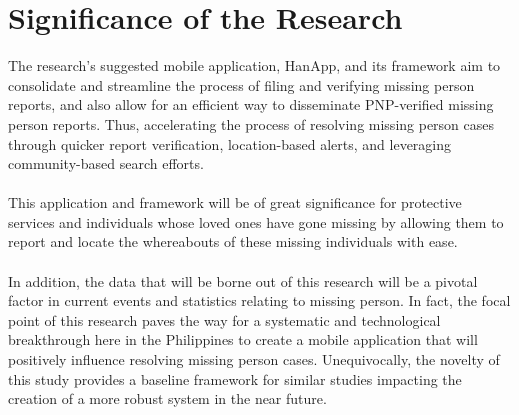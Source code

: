 \section{Significance of the Research}
\label{sec:significance}
The research’s suggested mobile application, HanApp, and its framework aim to consolidate and streamline the process of filing and verifying missing person reports, and also allow for an efficient way to disseminate PNP-verified missing person reports. Thus, accelerating the process of resolving missing person cases through quicker report verification, location-based alerts, and leveraging community-based search efforts. 
\\\\This application and framework will be of great significance for protective services and individuals whose loved ones have gone missing by allowing them to report and locate the whereabouts of these missing individuals with ease.
\\\\In addition, the data that will be borne out of this research will be a pivotal factor in current events and statistics relating to missing person. In fact, the focal point of this research paves the way for a systematic and technological breakthrough here in the Philippines to create a mobile application that will positively influence resolving missing person cases. Unequivocally, the novelty of this study provides a baseline framework for similar studies impacting the creation of a more robust system in the near future.


